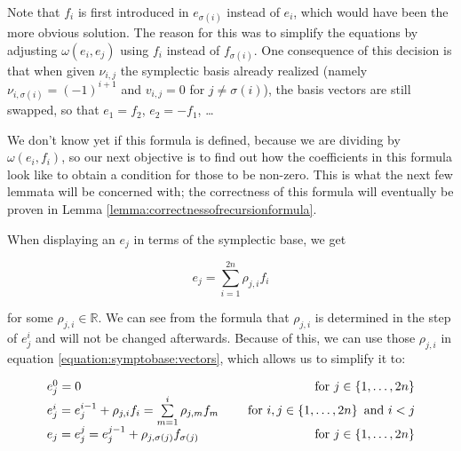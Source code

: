 \documentclass[../SymplecticSimplices.tex]{subfiles}
\begin{document}
Note that \( f_i \) is first introduced in \( e_{\sigma \left( i \right)} \) instead of \( e_i \), which would have been the more obvious solution. The reason for this was to simplify the equations by adjusting \( \omega \left( e_i, e_j \right) \) using \( f_i \) instead of \( f_{\sigma \left( i \right)} \). One consequence of this decision is that when given \( \nu_{i,j} \) the symplectic basis already realized (namely \( \nu_{i, \sigma \left( i \right)} = \left( -1 \right)^{i + 1} \) and \( v_{i,j} = 0 \) for \( j \neq \sigma \left( i \right) \)), the basis vectors are still swapped, so that \( e_1 = f_2 \), \( e_2 = -f_1 \), \dots  

We don't know yet if this formula is defined, because we are dividing by \( \omega\left( e_i, f_i \right) \), so our next objective is to find out how the coefficients in this formula look like to obtain a condition for those to be non-zero. This is what the next few lemmata will be concerned with; the correctness of this formula will eventually be proven in Lemma \ref{lemma:correctnessofrecursionformula}.

When displaying an \( e_j \) in terms of the symplectic base, we get

\begin{equation}
  \label{equation:eintermsofrhoandf}
  e_j = \sum_{i=1}^{2n} \rho_{j,i} f_i
\end{equation}

for some \( \rho_{j,i} \in \mathbb{R} \). We can see from the formula that \( \rho_{j,i} \) is determined in the step of \( e_j^i \) and will not be changed afterwards. Because of this, we can use those \( \rho_{j,i} \) in equation \eqref{equation:symptobase:vectors}, which allows us to simplify it to:

\begin{equation}
  \label{equation:symptobase:vectorswithrho}
  \begin{array}{llr}
    e_j^0 = 0 & & \textnormal{ for } j \in \left\lbrace 1, \dots, 2n \right\rbrace \\
    e_j^i = e_j^{i-1} + \rho_{j,i}  f_i = \sum\limits_{m=1}^{i} \rho_{j,m} f_m & & \textnormal{ for } i,j \in \left\lbrace 1, \dots, 2n \right\rbrace \textnormal{ and } i < j\\
    e_j = e_j^j = e_j^{j-1} + \rho_{j,\sigma \left( j \right)} f_{\sigma \left( j \right)} & & \textnormal{ for } j \in \left\lbrace 1, \dots, 2n \right\rbrace
  \end{array}
\end{equation}
\end{document}

